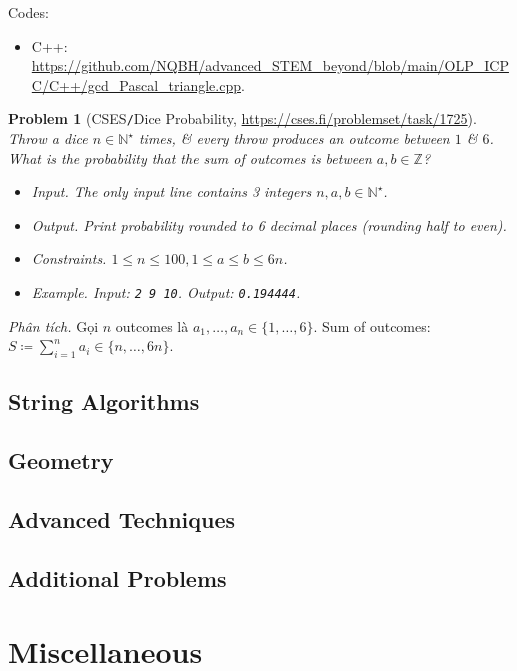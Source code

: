 \documentclass{article}
\newtheorem{problem}{Problem}
\begin{document}
Codes:
\begin{itemize}
	\item C++: \url{https://github.com/NQBH/advanced_STEM_beyond/blob/main/OLP_ICPC/C++/gcd_Pascal_triangle.cpp}.
\end{itemize}

\begin{problem}[CSES{\tt/}Dice Probability, \url{https://cses.fi/problemset/task/1725}]
	Throw a dice $n\in\mathbb{N}^\star$ times, \& every throw produces an outcome between $1$ \& $6$. What is the probability that the sum of outcomes is between $a,b\in\mathbb{Z}$?
	\begin{itemize}
		\item {\sf Input.} The only input line contains 3 integers $n,a,b\in\mathbb{N}^\star$.
		\item {\sf Output.} Print probability rounded to 6 decimal places (rounding half to even).
		\item {\sf Constraints.} $1\le n\le100,1\le a\le b\le6n$.
		\item {\sf Example.} Input: {\tt2 9 10}. Output: {\tt0.194444}.
	\end{itemize}
\end{problem}
{\it Phân tích.} Gọi $n$ outcomes là $a_1,\ldots,a_n\in\{1,\ldots,6\}$. Sum of outcomes: $S\coloneqq\sum_{i=1}^n a_i\in\{n,\ldots,6n\}$.

\subsection{String Algorithms}

\subsection{Geometry}

\subsection{Advanced Techniques}

\subsection{Additional Problems}


\section{Miscellaneous}
\end{document}
